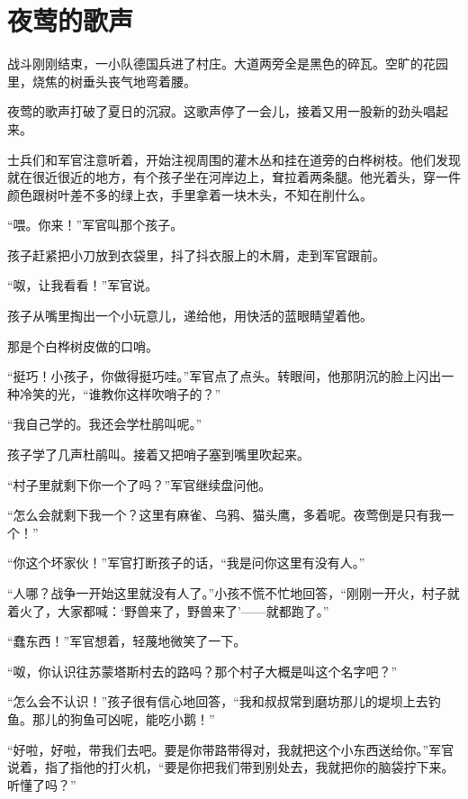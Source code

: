 \documentclass[12pt,UTF-8,openany]{ctexbook}
\begin{document}
\chapter{夜莺的歌声}

\begin{Large}
    
    战斗刚刚结束，一小队德国兵进了村庄。大道两旁全是黑色的碎瓦。空旷的花园里，烧焦的树垂头丧气地弯着腰。
    
    夜莺的歌声打破了夏日的沉寂。这歌声停了一会儿，接着又用一股新的劲头唱起来。
    
    士兵们和军官注意听着，开始注视周围的灌木丛和挂在道旁的白桦树枝。他们发现就在很近很近的地方，有个孩子坐在河岸边上，耷拉着两条腿。他光着头，穿一件颜色跟树叶差不多的绿上衣，手里拿着一块木头，不知在削什么。
    
    “喂。你来！”军官叫那个孩子。
    
    孩子赶紧把小刀放到衣袋里，抖了抖衣服上的木屑，走到军官跟前。
    
    “呶，让我看看！”军官说。
    
    孩子从嘴里掏出一个小玩意儿，递给他，用快活的蓝眼睛望着他。
    
    那是个白桦树皮做的口哨。
    
    “挺巧！小孩子，你做得挺巧哇。”军官点了点头。转眼间，他那阴沉的脸上闪出一种冷笑的光，“谁教你这样吹哨子的？”
    
    “我自己学的。我还会学杜鹃叫呢。”
    
    孩子学了几声杜鹃叫。接着又把哨子塞到嘴里吹起来。
    
    “村子里就剩下你一个了吗？”军官继续盘问他。
    
    “怎么会就剩下我一个？这里有麻雀、乌鸦、猫头鹰，多着呢。夜莺倒是只有我一个！”
    
    “你这个坏家伙！”军官打断孩子的话，“我是问你这里有没有人。”
    
    “人哪？战争一开始这里就没有人了。”小孩不慌不忙地回答，“刚刚一开火，村子就着火了，大家都喊：‘野兽来了，野兽来了’——就都跑了。”
    
    “蠢东西！”军官想着，轻蔑地微笑了一下。
    
    “呶，你认识往苏蒙塔斯村去的路吗？那个村子大概是叫这个名字吧？”
    
    “怎么会不认识！”孩子很有信心地回答，“我和叔叔常到磨坊那儿的堤坝上去钓鱼。那儿的狗鱼可凶呢，能吃小鹅！”
    
    “好啦，好啦，带我们去吧。要是你带路带得对，我就把这个小东西送给你。”军官说着，指了指他的打火机，“要是你把我们带到别处去，我就把你的脑袋拧下来。听懂了吗？”
    

\end{Large}
\end{document}
